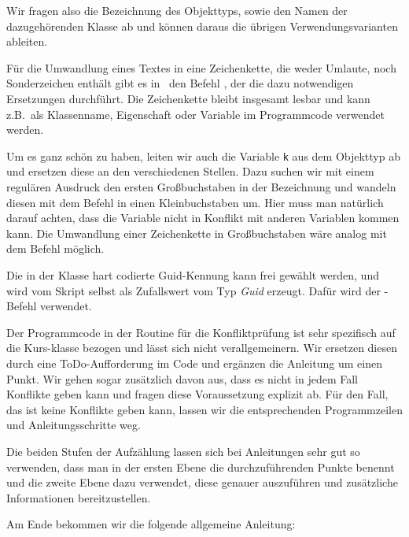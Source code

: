 Wir fragen also die Bezeichnung des Objekttyps, sowie den Namen der dazugehörenden Klasse ab und können daraus die übrigen Verwendungsvarianten ableiten.

Für die Umwandlung eines Textes in eine Zeichenkette, die weder Umlaute, noch Sonderzeichen enthält gibt es in \FPZ\ den Befehl , der  die dazu notwendigen Ersetzungen durchführt. Die Zeichenkette bleibt insgesamt lesbar und kann z.B.\ als Klassenname, Eigenschaft oder Variable im Programmcode verwendet werden.

Um es ganz schön zu haben, leiten wir auch die Variable \verb|k| aus dem Objekttyp ab und ersetzen diese an den verschiedenen Stellen. Dazu suchen wir mit einem regulären Ausdruck den ersten Großbuchstaben in der Bezeichnung und wandeln diesen mit dem Befehl  in einen Kleinbuchstaben um. Hier muss man natürlich darauf achten, dass die Variable nicht in Konflikt mit anderen Variablen kommen kann. Die Umwandlung einer Zeichenkette in Großbuchstaben wäre analog mit dem Befehl  möglich.

Die in der Klasse hart codierte Guid-Kennung kann frei gewählt werden, und wird vom Skript selbst als Zufallswert vom Typ \emph{Guid} erzeugt. Dafür wird der -Befehl verwendet.

Der Programmcode in der Routine für die Konfliktprüfung ist sehr spezifisch auf die Kurs-klasse bezogen und lässt sich nicht verallgemeinern. Wir ersetzen diesen durch eine ToDo-Aufforderung im Code und ergänzen die Anleitung um einen Punkt. Wir gehen sogar zusätzlich davon aus, dass es nicht in jedem Fall Konflikte geben kann und fragen diese Voraussetzung explizit ab. Für den Fall, das ist keine Konflikte geben kann, lassen wir die entsprechenden Programmzeilen und Anleitungsschritte weg. 

Die beiden Stufen der Aufzählung lassen sich bei Anleitungen sehr gut so verwenden, dass man in der ersten Ebene die durchzuführenden Punkte benennt und die zweite Ebene dazu verwendet, diese genauer auszuführen und zusätzliche Informationen bereitzustellen.

Am Ende bekommen wir die folgende allgemeine Anleitung:

